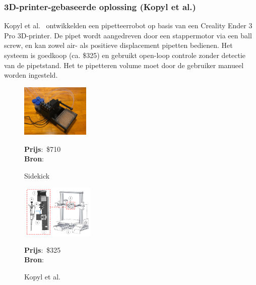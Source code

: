 \subsubsection{3D-printer-gebaseerde oplossing (Kopyl et al.)} 
Kopyl et al.\ \cite{RN42} ontwikkelden een pipetteerrobot op basis van een Creality Ender 3 Pro 3D-printer. De pipet wordt aangedreven door een stappermotor via een ball screw, en kan zowel air- als positieve displacement pipetten bedienen. Het systeem is goedkoop (ca. \$325) en gebruikt open-loop controle zonder detectie van de pipetstand. Het te pipetteren volume moet door de gebruiker manueel worden ingesteld.
\\[12pt]\begin{minipage}[t]{0.49\textwidth}
    \vspace{0pt}
    \begin{figure}[H]
        \centering
        \captionsetup{width=0.85\textwidth} %
        \includegraphics[height=2.5cm]{figures/Sidekick.png}
        \caption{Sidekick}\label{fig:Sidekick}
        \textbf{Prijs}:\ \$710\\
        \textbf{Bron}:\ \cite{RN41}
    \end{figure}
\end{minipage}
\begin{minipage}[t]{0.49\textwidth}
    \vspace{0pt}
    \begin{figure}[H]
        \centering
        \captionsetup{width=1\textwidth} %
        \includegraphics[height=2.5cm]{figures/kopyl-et-al.png}
        \caption{Kopyl et al.}\label{fig:kopyl}
        \textbf{Prijs}:\ \$325\\
        \textbf{Bron}:\ \cite{RN42}
    \end{figure}
\end{minipage}